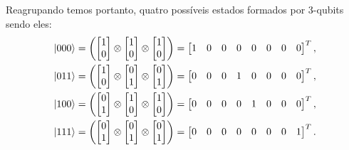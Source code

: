 Reagrupando temos portanto, quatro possíveis estados formados por 3-qubits sendo eles:
\begin{equation}\label{eq:3qubit}
	\begin{split}
\ket{000} &= \left( \begin{bmatrix}
1 \\
0
\end{bmatrix} \otimes \begin{bmatrix}
1 \\
0
\end{bmatrix} \otimes \begin{bmatrix}
1 \\
0
\end{bmatrix}\right) = \begin{bmatrix}
1 & 0 & 0 & 0 & 0 & 0 & 0 & 0
\end{bmatrix}^T, \\
\ket{011} &= \left( \begin{bmatrix}
1 \\
0
\end{bmatrix} \otimes \begin{bmatrix}
0 \\
1
\end{bmatrix} \otimes \begin{bmatrix}
0 \\
1
\end{bmatrix}\right) = \begin{bmatrix}
0 & 0 & 0 & 1 & 0 & 0 & 0 & 0
\end{bmatrix}^T, \\
\ket{100} &= \left( \begin{bmatrix}
0 \\
1
\end{bmatrix} \otimes \begin{bmatrix}
1 \\
0
\end{bmatrix} \otimes \begin{bmatrix}
1 \\
0
\end{bmatrix}\right) = \begin{bmatrix}
0 & 0 & 0 & 0 & 1 & 0 & 0 & 0
\end{bmatrix}^T, \\
\ket{111} &=\left( \begin{bmatrix}
0 \\
1
\end{bmatrix} \otimes \begin{bmatrix}
0 \\
1
\end{bmatrix} \otimes \begin{bmatrix}
0 \\
1
\end{bmatrix}\right) = \begin{bmatrix}
0 & 0 & 0 & 0 & 0 & 0 & 0 & 1
\end{bmatrix}^T.
	\end{split}
\end{equation}
